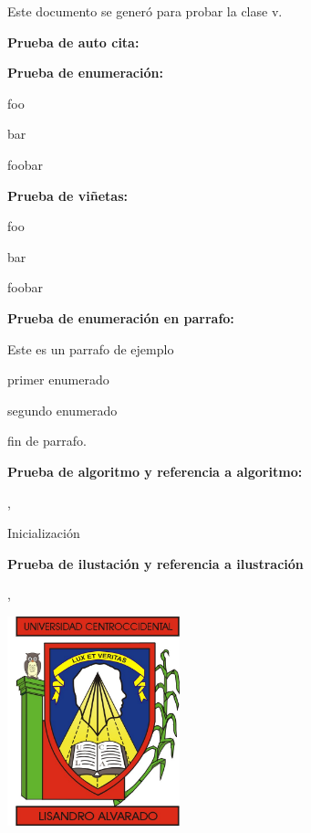 
Este documento se generó para probar la clase  v\uclamscversion.

\espaciodoble\textbf{Prueba de auto cita:}

\yo

\espaciodoble\textbf{Prueba de enumeración:}

\begin{enumeracion}
	\item foo
	\item bar
	\item foobar
\end{enumeracion}

\espaciodoble\textbf{Prueba de viñetas:}

\begin{vinetas}
	\item foo
	\item bar
	\item foobar
\end{vinetas}

\espaciodoble\textbf{Prueba de enumeración en parrafo:}

Este es un parrafo de ejemplo\begin{enumeracionenparrafo}
\item primer enumerado \item segundo enumerado\end{enumeracionenparrafo}
fin de parrafo.

\break

\espaciodoble\textbf{Prueba de algoritmo y referencia a algoritmo:}

, 

\begin{algoritmo}[fuente=Prueba de fuente, titulo=Algoritmo, indice=Indice del algoritmo, etiqueta=alg]
Inicialización\;
\end{algoritmo}

\break

\espaciodoble\textbf{Prueba de ilustación y referencia a ilustración}

, 

\begin{ilustracion}[fuente=Prueba de fuente, etiqueta=ilustracion, titulo=Prueba de ilustración, indice=Indice de prueba para ilustración]
	\includegraphics[width=5cm]{escudo-ucla.jpg}
\end{ilustracion}

